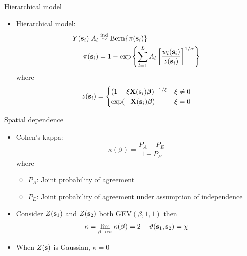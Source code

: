 \documentclass{beamer}
\begin{document}
\begin{frame}{Hierarchical model}
	\begin{itemize} \setlength{\itemsep}{1em}
		\item Hierarchical model:
		\begin{align*}
		Y(\mathbf{s}_i) | A_l &\stackrel{\mathrm{ind}}{\sim} \text{Bern}\{\pi(\mathbf{s}_i)\}\\
		\pi(\mathbf{s}_i) &= 1 - \exp\left\{ \sum_{l = 1}^L A_l \left[\frac{ w_l (\mathbf{s}_i) }{z(\mathbf{s}_i)} \right]^{1 / \alpha} \right\}\\
		\end{align*} \vspace{-0.5em}
		where $$z(\mathbf{s}_i) = \begin{cases}
		(1 - \xi \mathbf{X}(\mathbf{s}_i) \mbox{\boldmath $\beta$})^{-1 / \xi} & \xi \neq 0 \\
		\exp(-\mathbf{X}(\mathbf{s}_i) \mbox{\boldmath $\beta$}) & \xi = 0
		\end{cases}$$
	\end{itemize}
\end{frame}

\begin{frame}{Spatial dependence}
	\begin{itemize} \setlength{\itemsep}{1em}
		\item Cohen's kappa: $$\kappa(\beta) = \frac{P_A - P_E}{1 - P_E}$$
		where
		\begin{itemize} \setlength{\itemsep}{0.5em}
			\item $P_A$: Joint probability of agreement
			\item $P_E$: Joint probability of agreement under assumption of independence
		\end{itemize}
		\item Consider $Z(\mathbf{s}_1)$ and $Z(\mathbf{s}_2)$ both GEV$(\beta, 1, 1)$ then $$\kappa = \lim_{\beta \rightarrow \infty} \kappa(\beta) = 2 - \vartheta(\mathbf{s}_1, \mathbf{s}_2) = \chi$$
		\item When $Z(\mathbf{s})$ is Gaussian, $\kappa = 0$
	\end{itemize}
\end{frame}
\end{document}
